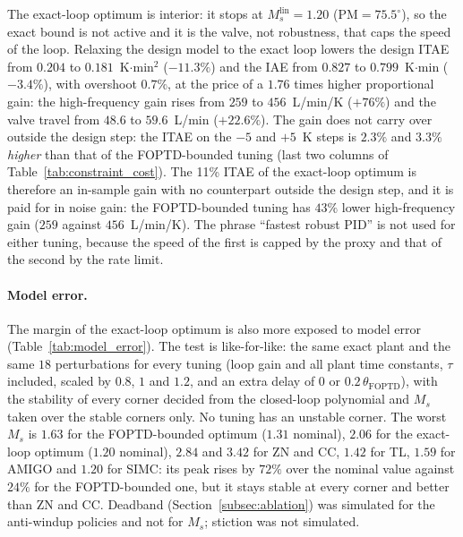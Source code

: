 

The exact-loop optimum is interior: it stops at $M_s^{\mathrm{lin}} = 1.20$ ($\mathrm{PM} = 75.5^\circ$), so the exact bound is not active and it is the valve, not robustness, that caps the speed of the loop. Relaxing the design model to the exact loop lowers the design ITAE from $0.204$ to $0.181$~K$\cdot$min$^2$ ($-11.3\%$) and the IAE from $0.827$ to $0.799$~K$\cdot$min ($-3.4\%$), with overshoot $0.7\%$, at the price of a $1.76$ times higher proportional gain: the high-frequency gain rises from $259$ to $456$~L/min/K ($+76\%$) and the valve travel from $48.6$ to $59.6$~L/min ($+22.6\%$). The gain does not carry over outside the design step: the ITAE on the $-5$ and $+5$~K steps is $2.3\%$ and $3.3\%$ \emph{higher} than that of the FOPTD-bounded tuning (last two columns of Table~\ref{tab:constraint_cost}). The 11\% ITAE of the exact-loop optimum is therefore an in-sample gain with no counterpart outside the design step, and it is paid for in noise gain: the FOPTD-bounded tuning has $43\%$ lower high-frequency gain ($259$ against $456$~L/min/K). The phrase ``fastest robust PID'' is not used for either tuning, because the speed of the first is capped by the proxy and that of the second by the rate limit.

\paragraph{Model error.} The margin of the exact-loop optimum is also more exposed to model error (Table~\ref{tab:model_error}). The test is like-for-like: the same exact plant and the same $18$ perturbations for every tuning (loop gain and all plant time constants, $\tau$ included, scaled by $0.8$, $1$ and $1.2$, and an extra delay of $0$ or $0.2\,\theta_{\mathrm{FOPTD}}$), with the stability of every corner decided from the closed-loop polynomial and $M_s$ taken over the stable corners only. No tuning has an unstable corner. The worst $M_s$ is $1.63$ for the FOPTD-bounded optimum ($1.31$ nominal), $2.06$ for the exact-loop optimum ($1.20$ nominal), $2.84$ and $3.42$ for ZN and CC, $1.42$ for TL, $1.59$ for AMIGO and $1.20$ for SIMC: its peak rises by $72\%$ over the nominal value against $24\%$ for the FOPTD-bounded one, but it stays stable at every corner and better than ZN and CC. Deadband (Section~\ref{subsec:ablation}) was simulated for the anti-windup policies and not for $M_s$; stiction was not simulated.




